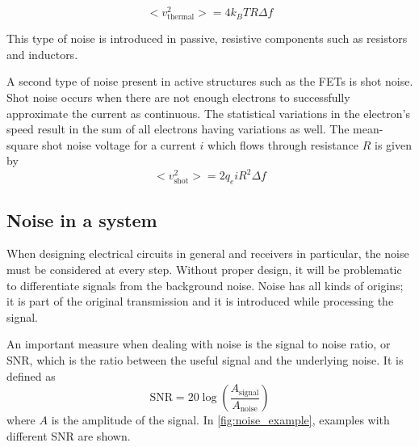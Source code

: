 			\begin{equation}
				< v^2_\text{thermal} > = 4k_BTR\Delta f
			\end{equation}
		
			This type of noise is introduced in passive, resistive components such as resistors and inductors.
			
			A second type of noise present in active structures such as the FETs is shot noise. Shot noise occurs when there are not enough electrons to successfully approximate the current as continuous. The statistical variations in the electron's speed result in the sum of all electrons having variations as well. The mean-square shot noise voltage for a current $i$ which flows through resistance $R$ is given by
			\begin{equation}
				< v^2_\text{shot} > = 2q_eiR^2\Delta f
			\end{equation}
			
		\subsection{Noise in a system}
			When designing electrical circuits in general and receivers in particular, the noise must be considered at every step. Without proper design, it will be problematic to differentiate signals from the background noise. Noise has all kinds of origins; it is part of the original transmission and it is introduced while processing the signal.
			
			An important measure when dealing with noise is the signal to noise ratio, or SNR, which is the ratio between the useful signal and the underlying noise. It is defined as
			\begin{equation}
					\text{SNR}=20\log \left(\frac{ A_\text{signal} }{ A_\text{noise} }\right) 
			\end{equation}
			where $A$ is the amplitude of the signal. In \autoref{fig:noise_example}, examples with different SNR are shown.

